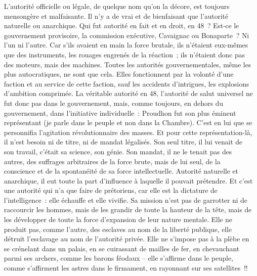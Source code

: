 \documentclass[french,twoside]{book} %
\begin{document}
L’autorité officielle ou légale, de quelque nom qu’on la décore, est toujours mensongère et malfaisante. Il n’y a de vrai et de bienfaisant que l’autorité naturelle ou anarchique. Qui fut autorité en fait et en droit, en 48 ? Est-ce le gouvernement provisoire, la commission exécutive, Cavaignac ou Bonaparte ? Ni l’un ni l’autre. Car s’ils avaient en main la force brutale, ils n’étaient eux-mêmes que des instruments, les rouages engrenés de la réaction ; ils n’étaient donc pas des moteurs, mais des machines. Toutes les autorités gouvernementales, même les plus autocratiques, ne sont que cela. Elles fonctionnent par la volonté d’une faction et au service de cette faction, sauf les accidents d’intrigues, les explosions d’ambition comprimée. La véritable autorité en 48, l’autorité de salut universel ne fut donc pas dans le gouvernement, mais, comme toujours, en dehors du gouvernement, dans l’initiative individuelle : Proudhon fut son plus éminent représentant (je parle dans le peuple et non dans la Chambre). C’est en lui que se personnifia l’agitation révolutionnaire des masses. Et pour cette représentation-là, il n’est besoin ni de titre, ni de mandat légalisés. Son seul titre, il lui venait de son travail, c’était sa science, son génie. Son mandat, il ne le tenait pas des autres, des suffrages arbitraires de la force brute, mais de lui seul, de la conscience et de la spontanéité de sa force intellectuelle. Autorité naturelle et anarchique, il eut toute la part d’influence à laquelle il pouvait prétendre. Et c’est une autorité qui n’a que faire de prétoriens, car elle est la dictature de l’intelligence : elle échauffe et elle vivifie. Sa mission n’est pas de garrotter ni de raccourcir les hommes, mais de les grandir de toute la hauteur de la tête, mais de les développer de toute la force d’expansion de leur nature mentale. Elle ne produit pas, comme l’autre, des esclaves au nom de la liberté publique, elle détruit l’esclavage au nom de l’autorité privée. Elle ne s’impose pas à la plèbe en se crénelant dans un palais, en se cuirassant de mailles de fer, en chevauchant parmi ses archers, comme les barons féodaux – elle s’affirme dans le peuple, comme s’affirment les astres dans le firmament, en rayonnant sur ses satellites !!\par
\end{document}
